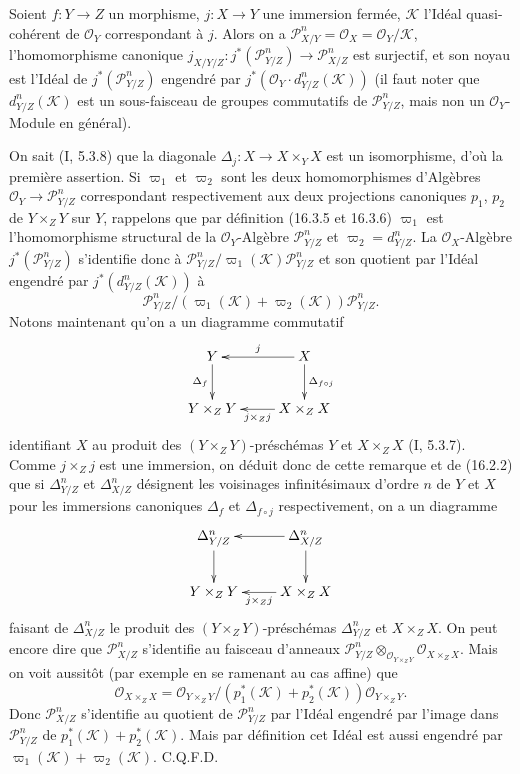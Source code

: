 \begin{proposition}[16.4.20]
\label{IV.16.4.20}
Soient $f:Y\to Z$ un morphisme, $j:X\to Y$ une immersion fermée,
$\mathscr{K}$ l'Idéal quasi-cohérent de $\mathcal{O}_Y$ correspondant à $j$.
Alors on a
$\mathscr{P}_{X/Y}^n=\mathcal{O}_X=\mathcal{O}_Y/\mathscr{K}$,
l'homomorphisme canonique
$j_{X/Y/Z}:j^*(\mathscr{P}_{Y/Z}^n)\to\mathscr{P}_{X/Z}^n$ est surjectif, et
son noyau est l'Idéal de $j^*(\mathscr{P}_{Y/Z}^n)$ engendré par
$j^*(\mathcal{O}_Y\cdot d_{Y/Z}^n(\mathscr{K}))$ (il faut noter que
$d_{Y/Z}^n(\mathscr{K})$ est un sous-faisceau de groupes commutatifs de
$\mathscr{P}_{Y/Z}^n$, mais non un $\mathcal{O}_Y$-Module en général).
\end{proposition}

On sait (I, 5.3.8) que la diagonale
$\Delta_j:X\to X\times_Y X$ est un isomorphisme, d'où la première assertion.
Si $\varpi_1$ et $\varpi_2$ sont les deux homomorphismes d'Algèbres
$\mathcal{O}_Y\to\mathscr{P}_{Y/Z}^n$ correspondant respectivement aux deux
projections canoniques $p_1$, $p_2$ de $Y\times_Z Y$ sur $Y$, rappelons que
par définition (16.3.5 et 16.3.6) $\varpi_1$ est l'homomorphisme structural de
la $\mathcal{O}_Y$-Algèbre $\mathscr{P}_{Y/Z}^n$ et
$\varpi_2=d_{Y/Z}^n$. La $\mathcal{O}_X$-Algèbre
$j^*(\mathscr{P}_{Y/Z}^n)$ s'identifie donc à
$\mathscr{P}_{Y/Z}^n/\varpi_1(\mathscr{K})\mathscr{P}_{Y/Z}^n$ et son quotient
par l'Idéal engendré par $j^*(d_{Y/Z}^n(\mathscr{K}))$ à
\[
  \mathscr{P}_{Y/Z}^n/
  (\varpi_1(\mathscr{K})+\varpi_2(\mathscr{K}))\mathscr{P}_{Y/Z}^n.
\]
Notons maintenant qu'on a un diagramme commutatif
\[
  \xymatrix{
    Y\ar[d]_-{\Delta_f}&X\ar[l]_-j\ar[d]^-{\Delta_{f\circ j}}\\
    Y\times_Z Y&X\times_Z X\ar[l]^-{j\times_Z j}
  }
\]
identifiant $X$ au produit des $(Y\times_Z Y)$-préschémas $Y$ et
$X\times_Z X$ (I, 5.3.7). Comme $j\times_Z j$ est une immersion, on déduit
donc de cette remarque et de (16.2.2) que si $\Delta_{Y/Z}^n$ et
$\Delta_{X/Z}^n$ désignent les voisinages infinitésimaux d'ordre $n$ de $Y$
et $X$ pour les immersions canoniques $\Delta_f$ et $\Delta_{f\circ j}$
respectivement, on a un diagramme
\[
  \xymatrix{
    \Delta_{Y/Z}^n\ar[d]&\Delta_{X/Z}^n\ar[l]\ar[d]\\
    Y\times_Z Y&X\times_Z X\ar[l]^-{j\times_Z j}
  }
\]
faisant de $\Delta_{X/Z}^n$ le produit des $(Y\times_Z Y)$-préschémas
$\Delta_{Y/Z}^n$ et $X\times_Z X$. On peut encore dire que
$\mathscr{P}_{X/Z}^n$ s'identifie au faisceau d'anneaux
$\mathscr{P}_{Y/Z}^n\otimes_{\mathcal{O}_{Y\times_Z Y}}
\mathcal{O}_{X\times_Z X}$. Mais on voit aussitôt (par exemple en se ramenant
au cas affine) que
\[
  \mathcal{O}_{X\times_Z X}=
  \mathcal{O}_{Y\times_Z Y}/
  (p_1^*(\mathscr{K})+p_2^*(\mathscr{K}))
  \mathcal{O}_{Y\times_Z Y}.
\]
Donc $\mathscr{P}_{X/Z}^n$ s'identifie au quotient de
$\mathscr{P}_{Y/Z}^n$ par l'Idéal engendré par l'image dans
$\mathscr{P}_{Y/Z}^n$ de $p_1^*(\mathscr{K})+p_2^*(\mathscr{K})$. Mais par
définition cet Idéal est aussi engendré par
$\varpi_1(\mathscr{K})+\varpi_2(\mathscr{K})$. C.Q.F.D.

